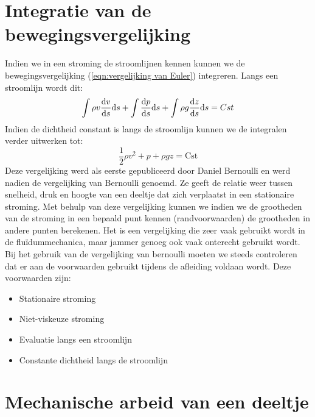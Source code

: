 	\section{Integratie van de bewegingsvergelijking}
	\label{sec:Integratie van de bewegingsvergelijking}
Indien we in een stroming de stroomlijnen kennen kunnen we de bewegingsvergelijking (\ref{eqn:vergelijking van Euler}) integreren. Langs een stroomlijn wordt dit:
\begin{equation}
	\int \rho v \frac{\mathrm{d} v}{\mathrm{d} s} \mathrm{d} s + \int \frac{\mathrm{d} p}{\mathrm{d} s} \mathrm{d} s + \int \rho g \frac{\mathrm{d} z}{\mathrm{d} s}  \mathrm{d} s = Cst
\end{equation}
Indien de dichtheid constant is langs de stroomlijn kunnen we de integralen verder uitwerken tot:
\begin{equation}
	\frac{1}{2} \rho v^2 + p + \rho g z = \text{Cst}
	\label{eqn:vergelijking van Bernoulli}
\end{equation}
Deze vergelijking werd als eerste gepubliceerd door Daniel Bernoulli en werd nadien de vergelijking van Bernoulli genoemd. Ze geeft de relatie weer tussen snelheid, druk en hoogte van een deeltje dat zich verplaatst in een stationaire stroming. Met behulp van deze vergelijking kunnen we indien we de grootheden van de stroming in een bepaald punt kennen (randvoorwaarden) de grootheden in andere punten berekenen. Het is een vergelijking die zeer vaak gebruikt wordt in de fluïdummechanica, maar jammer genoeg ook vaak onterecht gebruikt wordt. Bij het gebruik van de vergelijking van bernoulli moeten we steeds controleren dat er aan de voorwaarden gebruikt tijdens de afleiding voldaan wordt. Deze voorwaarden zijn:
\begin{itemize}
	\item Stationaire stroming
	\item Niet-viskeuze stroming
	\item Evaluatie langs een stroomlijn
	\item Constante dichtheid langs de stroomlijn
\end{itemize}
	
	\section{Mechanische arbeid van een deeltje}
	\label{sec:Mechanische arbeid van een deeltje}

